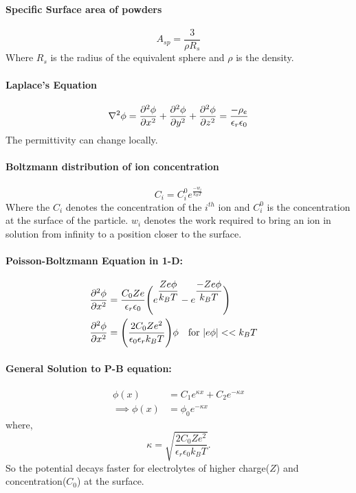 \documentclass[12pt,a4paper,twocolumn]{article}
\author{\sffamily{\color{blue}{Advait Risbud}}}
\date{May 21'}
\title{\sffamily{MM 409: Colloids and Interface Science}}
\begin{document}
	\sffamily
	\maketitle
	\pagebreak
	\paragraph*{Specific Surface area of powders}
	\begin{equation}
	\boxed{	A_{sp}=\dfrac{3}{\rho R_s} }
	\end{equation}
Where $R_s$ is the radius of the equivalent sphere and $\rho$ is the density. 
\paragraph*{Laplace's Equation}
\begin{equation}
	\laplacian{\phi}=\pdv[2]{\phi}{x}+\pdv[2]{\phi}{y}+\pdv[2]{\phi}{z}=\dfrac{-\rho_e}{\epsilon_r\epsilon_0}
\end{equation}
The permittivity can change locally.

\paragraph*{Boltzmann distribution of ion concentration}
\begin{equation}
	\boxed{C_i=C_i^0 e^{\frac{-w_i}{k_BT}}}
\end{equation}
Where the $C_i$ denotes the concentration of the $i^{th}$ ion and $C_i^0$ is the concentration at the surface of the particle. $w_i$ denotes the work required to bring an ion in solution from infinity to a position closer to the surface. 

\paragraph*{Poisson-Boltzmann Equation in 1-D:}
\begin{align}
\pdv[2]{\phi}{x}&=\dfrac{C_0 Ze}{\epsilon_r \epsilon_0}\Bigg(e^{\dfrac{Ze\phi}{k_B T}}-e^{\dfrac{-Ze\phi}{k_B T}}\Bigg) \\
\pdv[2]{\phi}{x}&=\Bigg(\dfrac{2C_0 Ze^2}{\epsilon_0\epsilon_r k_B T}\Bigg)\phi \qq{for $\abs{e\phi}<<k_BT$}
\end{align}

\paragraph*{General Solution to P-B equation:}
\begin{align}
	\phi(x)&=C_1e^{\kappa x}+C_2e^{-\kappa x} \\
	\implies \phi(x)&=\phi_0 e^{-\kappa x}
\end{align}
where,
\begin{equation}
	\boxed{\kappa=\sqrt{\dfrac{2C_0 Ze^2}{\epsilon_r\epsilon_0 k_B T}}.}
\end{equation}
So the potential decays faster for electrolytes of higher charge($Z$) and concentration($C_0$) at the surface. 
\end{document}
